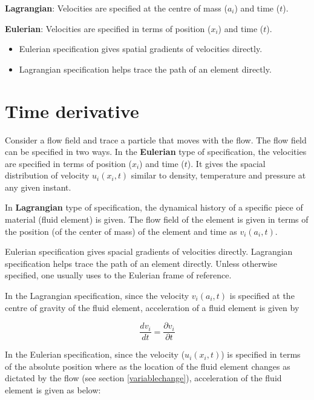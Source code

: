 

{\bf Lagrangian}:
Velocities are specified at the centre of mass ($a_i$) and time ($t$).

{\bf Eulerian}:
Velocities are specified in terms of position ($x_i$) and time ($t$).

\begin{itemize}
\item Eulerian specification gives spatial gradients of velocities directly.
\item Lagrangian specification helps trace the path of an element directly.
\end{itemize}



\section{Time derivative}

Consider a flow field and trace a particle that moves with the flow. The flow field can be specified in two ways. In the {\bf Eulerian} type of specification, the velocities are specified in terms of position ($x_i$) and time ($t$). It gives the spacial distribution of velocity $u_i(x_i,t)$ similar to density, temperature and pressure at any given instant. 

In {\bf Lagrangian} type of specification, the dynamical history of a specific piece of material (fluid element) is given. The flow field of the element is given in terms of the position (of the center of mass) of the element and time as $v_i(a_i,t)$. 

Eulerian specification gives spacial gradients of velocities directly. Lagrangian specification helps trace the path of an element directly. Unless otherwise specified, one usually uses to the Eulerian frame of reference.

In the Lagrangian specification, since the velocity $v_i(a_i, t)$ is specified at the centre of gravity of the fluid element, acceleration of a fluid element is given by

\begin{equation}
\frac{dv_i}{dt} = \frac{\partial v_i}{\partial t} 
\end{equation} 

In the Eulerian specification, since the velocity ($u_i(x_i,t)$) is specified in terms of the absolute position where as the location of the fluid element changes as dictated by the flow  (see section \ref{variablechange}), acceleration of the fluid element is given as below:

